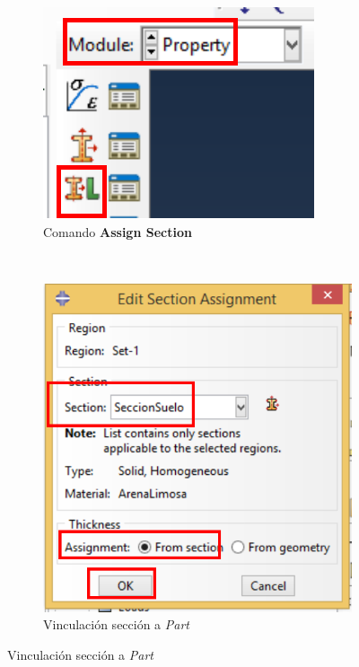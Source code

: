   \begin{figure}
    \centering
    \begin{subfigure}[!h]{0.20\textwidth}
      \includegraphics[width=\textwidth]{./body/images/prop05p.pdf}
      \caption{Comando \textbf{Assign Section}}
      \label{prop05p}
    \end{subfigure}%
    ~
    \begin{subfigure}[!h]{0.39\textwidth}
      \includegraphics[width=\textwidth]{./body/images/prop06.pdf}
      \caption{Vinculación sección a \textit{Part}}
      \label{prop06}
    \end{subfigure}%
    

\end{figure}
